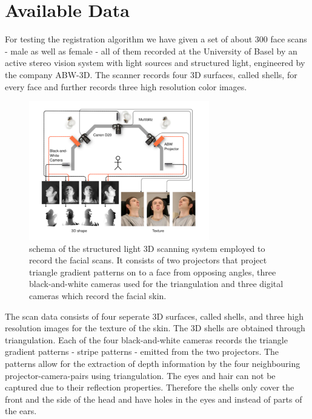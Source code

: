 \section{Available Data}
For testing the registration algorithm we have given a set of about 300 face scans - male as well as female - all of them recorded at the University of Basel by an active stereo vision system with light sources and structured light, engineered by the company ABW-3D. The scanner records four 3D surfaces, called shells, for every face and further records three high resolution color images. 
\begin{figure}
\centering
\includegraphics[width=0.7\textwidth]{./resources/figures/scanner.pdf}
\caption{schema of the structured light 3D scanning system employed to record the facial scans. It consists of two projectors that project triangle gradient patterns on to a face from opposing angles, three black-and-white cameras used for the triangulation and three digital cameras which record the facial skin.}
\label{fig:scanner}
\end{figure}
The scan data consists of four seperate 3D surfaces, called shells, and three high resolution
images for the texture of the skin. The 3D shells are obtained through triangulation.
Each of the four black-and-white cameras records the triangle gradient patterns - stripe patterns - emitted from the two projectors. The patterns allow for the extraction of depth information by the four neighbouring projector-camera-pairs using triangulation.  
The eyes and hair can not be captured due to their reflection properties. Therefore the shells only cover the front and the side of the head and have holes in the eyes and instead of parts of the ears. 

